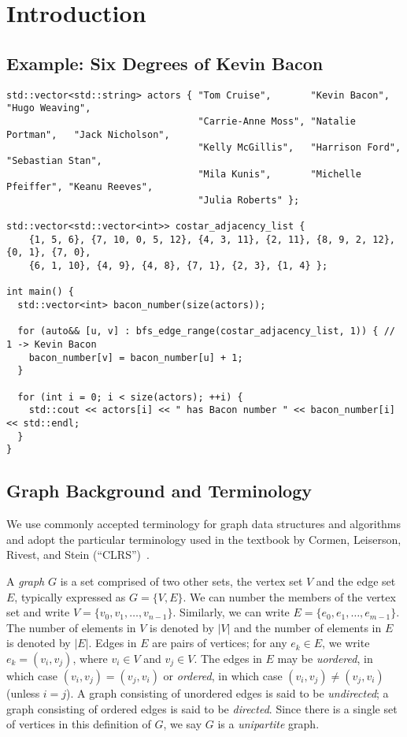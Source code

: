 
\section{Introduction}

\subsection{Example: Six Degrees of Kevin Bacon}

{\small
\begin{lstlisting}
std::vector<std::string> actors { "Tom Cruise",       "Kevin Bacon",       "Hugo Weaving",
                                  "Carrie-Anne Moss", "Natalie Portman",   "Jack Nicholson",
                                  "Kelly McGillis",   "Harrison Ford",     "Sebastian Stan",
                                  "Mila Kunis",       "Michelle Pfeiffer", "Keanu Reeves",
                                  "Julia Roberts" };

std::vector<std::vector<int>> costar_adjacency_list {
    {1, 5, 6}, {7, 10, 0, 5, 12}, {4, 3, 11}, {2, 11}, {8, 9, 2, 12}, {0, 1}, {7, 0},
    {6, 1, 10}, {4, 9}, {4, 8}, {7, 1}, {2, 3}, {1, 4} };

int main() {
  std::vector<int> bacon_number(size(actors));

  for (auto&& [u, v] : bfs_edge_range(costar_adjacency_list, 1)) { // 1 -> Kevin Bacon
    bacon_number[v] = bacon_number[u] + 1;
  }

  for (int i = 0; i < size(actors); ++i) {
    std::cout << actors[i] << " has Bacon number " << bacon_number[i] << std::endl;
  }
}
\end{lstlisting}
}

\subsection{Graph Background and Terminology}

We use commonly accepted terminology for graph data structures and algorithms and 
adopt the particular terminology used in the textbook by
Cormen, Leiserson, Rivest, and Stein (``CLRS'')~\cite{CLRS2022}.

A \emph{graph} $G$ is a set comprised of two other sets, the vertex set $V$ and the edge set $E$, 
typically expressed as $G=\{V,E\}$.  We can number the members of the vertex set
and write $V = \{ v_0, v_1, \ldots , v_{n-1} \}$.  Similarly, we can write $E = \{ e_0, e_1, \ldots, e_{m-1} \}$.  The number of elements in $V$ is denoted by $|V|$ and the number of elements in $E$ is denoted by $|E|$.  Edges in $E$ are pairs of vertices; for any $e_k \in E$, we write $e_k = ( v_i, v_j )$, where $v_i \in V$ and $v_j\in V$.  The edges in $E$ may be \emph{uordered}, in which case $(v_i, v_j) = (v_j, v_i)$ or \emph{ordered}, in which case $(v_i, v_j) \neq (v_j, v_i)$ (unless $i = j$).
A graph consisting of unordered edges is said to be \emph{undirected}; 
a graph consisting of ordered edges is said to be \emph{directed}.  Since there is a single set of vertices in this definition of $G$, we say $G$ is a \emph{unipartite} graph.


